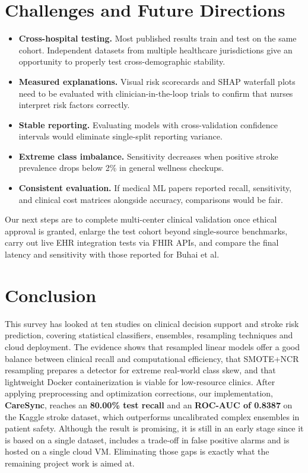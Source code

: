 \documentclass[10pt,twocolumn,a4paper]{article}
\begin{document}
\section{Challenges and Future Directions}
\begin{itemize}
    \item \textbf{Cross-hospital testing.} Most published results train and test on the same cohort. Independent datasets from multiple healthcare jurisdictions give an opportunity to properly test cross-demographic stability.
    \item \textbf{Measured explanations.} Visual risk scorecards and SHAP waterfall plots need to be evaluated with clinician-in-the-loop trials to confirm that nurses interpret risk factors correctly.
    \item \textbf{Stable reporting.} Evaluating models with cross-validation confidence intervals would eliminate single-split reporting variance.
    \item \textbf{Extreme class imbalance.} Sensitivity decreases when positive stroke prevalence drops below 2\% in general wellness checkups.
    \item \textbf{Consistent evaluation.} If medical ML papers reported recall, sensitivity, and clinical cost matrices alongside accuracy, comparisons would be fair.
\end{itemize}
Our next steps are to complete multi-center clinical validation once ethical approval is granted, enlarge the test cohort beyond single-source benchmarks, carry out live EHR integration tests via FHIR APIs, and compare the final latency and sensitivity with those reported for Buhai et al.

\section{Conclusion}
This survey has looked at ten studies on clinical decision support and stroke risk prediction, covering statistical classifiers, ensembles, resampling techniques and cloud deployment. The evidence shows that resampled linear models offer a good balance between clinical recall and computational efficiency, that SMOTE+NCR resampling prepares a detector for extreme real-world class skew, and that lightweight Docker containerization is viable for low-resource clinics. After applying preprocessing and optimization corrections, our implementation, \textbf{CareSync}, reaches an \textbf{80.00\% test recall} and an \textbf{ROC-AUC of 0.8387} on the Kaggle stroke dataset, which outperforms uncalibrated complex ensembles in patient safety. Although the result is promising, it is still in an early stage since it is based on a single dataset, includes a trade-off in false positive alarms and is hosted on a single cloud VM. Eliminating those gaps is exactly what the remaining project work is aimed at.
\end{document}
